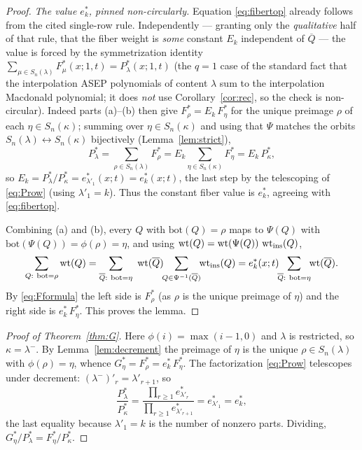 \begin{proof}
\emph{The value $e^*_k$, pinned non-circularly.} Equation \eqref{eq:fibertop} already
follows from the cited single-row rule. Independently --- granting only the
\emph{qualitative} half of that rule, that the fiber weight is \emph{some} constant
$E_k$ independent of $\overline Q$ --- the value is forced by the symmetrization
identity $\sum_{\mu\in S_n(\lambda)}F^*_\mu(x;1,t)=P^*_\lambda(x;1,t)$ (the $q=1$ case
of the standard fact that the interpolation ASEP polynomials of content $\lambda$ sum
to the interpolation Macdonald polynomial; it does \emph{not} use
Corollary~\ref{cor:rec}, so the check is non-circular). Indeed parts (a)--(b) then give
$F^*_\rho=E_k\,F^*_\eta$ for the unique preimage $\rho$ of each $\eta\in S_n(\kappa)$;
summing over $\eta\in S_n(\kappa)$ and using that $\Psi$ matches the orbits
$S_n(\lambda)\leftrightarrow S_n(\kappa)$ bijectively (Lemma~\ref{lem:strict}),
\[
P^*_\lambda=\sum_{\rho\in S_n(\lambda)}F^*_\rho
=E_k\sum_{\eta\in S_n(\kappa)}F^*_\eta=E_k\,P^*_\kappa,
\]
so $E_k=P^*_\lambda/P^*_\kappa=e^*_{\lambda'_1}(x;t)=e^*_k(x;t)$, the last step by the
telescoping of \eqref{eq:Prow} (using $\lambda'_1=k$). Thus the constant fiber value is
$e^*_k$, agreeing with \eqref{eq:fibertop}.

Combining (a) and (b), every $Q$ with $\mathrm{bot}(Q)=\rho$ maps to $\Psi(Q)$ with
$\mathrm{bot}(\Psi(Q))=\phi(\rho)=\eta$, and using
$\operatorname{wt}(Q)=\operatorname{wt}(\Psi(Q))\,\operatorname{wt}_{\mathrm{ins}}(Q)$,
\[
\sum_{Q:\ \mathrm{bot}=\rho}\qthreewt(Q)
=\sum_{\overline Q:\ \mathrm{bot}=\eta}\ \qthreewt(\overline Q)\!\!\sum_{Q\in\Psi^{-1}(\overline Q)}\!\!\qthreewt_{\mathrm{ins}}(Q)
=e^*_k(x;t)\!\!\sum_{\overline Q:\ \mathrm{bot}=\eta}\!\!\qthreewt(\overline Q).
\]
By \eqref{eq:Fformula} the left side is $F^*_\rho$ (as $\rho$ is the unique preimage
of $\eta$) and the right side is $e^*_k\,F^*_\eta$. This proves the lemma.
\end{proof}

\begin{proof}[Proof of Theorem~\ref{thm:G}]
Here $\phi(i)=\max(i-1,0)$ and $\lambda$ is restricted, so $\kappa=\lambda^-$. By
Lemma~\ref{lem:decrement} the preimage of $\eta$ is the unique $\rho\in S_n(\lambda)$
with $\phi(\rho)=\eta$, whence $G^*_\eta=F^*_\rho=e^*_k\,F^*_\eta$. The factorization
\eqref{eq:Prow} telescopes under decrement: $(\lambda^-)'_r=\lambda'_{r+1}$, so
\[
\frac{P^*_\lambda}{P^*_\kappa}
=\frac{\prod_{r\ge1}e^*_{\lambda'_r}}{\prod_{r\ge1}e^*_{\lambda'_{r+1}}}
=e^*_{\lambda'_1}=e^*_k ,
\]
the last equality because $\lambda'_1=k$ is the number of nonzero parts. Dividing,
$G^*_\eta/P^*_\lambda=F^*_\eta/P^*_\kappa$.
\end{proof}

